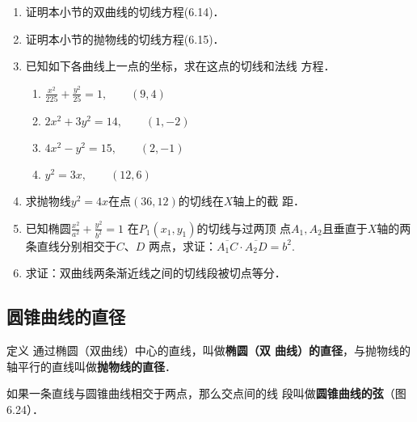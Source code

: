 \begin{ex}
\begin{enumerate}
    \item 证明本小节的双曲线的切线方程(6.14)．
    \item 证明本小节的抛物线的切线方程(6.15)．
    \item 已知如下各曲线上一点的坐标，求在这点的切线和法线
    方程．
\begin{enumerate}
    \item $\frac{x^2}{225}+\frac{y^2}{25}=1,\qquad (9,4)$
    \item $2x^2+3y^2=14,\qquad (1,-2)$
    \item $4x^2-y^2=15,\qquad (2,-1)$
    \item $y^2=3x,\qquad (12,6)$
\end{enumerate}

    \item 求抛物线$y^2=4x$在点$(36,12)$的切线在$X$轴上的截
    距．
    \item 已知椭圆$\frac{x^2}{a^2}+\frac{y^2}{b^2}=1$
  在$P_1(x_1,y_1)$的切线与过两顶
    点$A_1,A_2$且垂直于$X$轴的两条直线分别相交于$C$、$D$
    两点，求证：$\overline{A_1C}\cdot \overline{A_2D}=b^2$.
    \item 求证：双曲线两条渐近线之间的切线段被切点等分．
\end{enumerate}
\end{ex}

\subsection{圆锥曲线的直径}
\begin{blk}
  {定义} 通过椭圆（双曲线）中心的直线，叫做\textbf{椭圆（双
曲线）的直径}，与抛物线的轴平行的直线叫做\textbf{抛物线的直径}．

如果一条直线与圆锥曲线相交于两点，那么交点间的线
段叫做\textbf{圆锥曲线的弦}（图6.24）．  
\end{blk}

